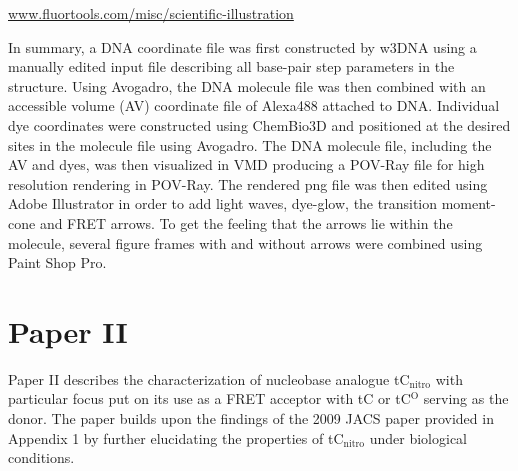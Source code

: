  \url{www.fluortools.com/misc/scientific-illustration}

 In summary, a DNA coordinate file was first constructed by w3DNA\cite{Zheng2009} using a manually edited input file describing all base-pair step parameters in the structure. Using Avogadro\cite{Hanwell2012}, the DNA molecule file was then combined with an accessible volume (AV) coordinate file of Alexa488 attached to DNA. Individual dye coordinates were constructed using ChemBio3D\cite{ChemBio3D} and positioned at the desired sites in the molecule file using Avogadro. The DNA molecule file, including the AV and dyes, was then visualized in VMD\cite{VMD} producing a POV-Ray file for high resolution rendering in POV-Ray\cite{POVray}. The rendered png file was then edited using Adobe Illustrator in order to add light waves, dye-glow, the transition moment-cone and FRET arrows. To get the feeling that the arrows lie within the molecule, several figure frames with and without arrows were combined using Paint Shop Pro.

%
%
\section{Paper II}
 Paper II describes the characterization of nucleobase analogue tC$_\mathrm{nitro}$ with particular focus put on its use as a FRET acceptor with tC or tC$^\mathrm{O}$ serving as the donor. The paper builds upon the findings of the 2009 JACS paper provided in Appendix 1 by further elucidating the properties of tC$_\mathrm{nitro}$ under biological conditions.

